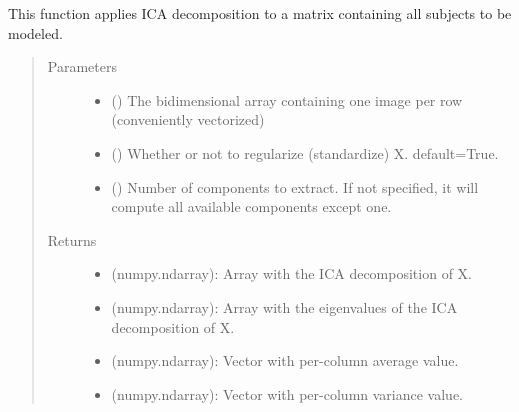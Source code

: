 \documentclass[letterpaper,10pt,english]{sphinxmanual}
\begin{document}

\begin{fulllineitems}
\label{\detokenize{api:brainSimulator.applyICA}}
This function applies ICA decomposition to a matrix containing all subjects to be modeled.
\begin{quote}\begin{description}
\item[{Parameters}] \leavevmode\begin{itemize}
\item {} 
 () \textendash{} The bidimensional array containing one image per row (conveniently vectorized)

\item {} 
 () \textendash{} Whether or not to regularize (standardize) X. default=True.

\item {} 
 () \textendash{} Number of components to extract. If not specified, it will compute all available components except one.

\end{itemize}

\item[{Returns}] \leavevmode
\begin{itemize}
\item {} 
 (numpy.ndarray): Array with the ICA decomposition of X.

\item {} 
 (numpy.ndarray): Array with the eigenvalues of the ICA         decomposition of X.

\item {} 
 (numpy.ndarray): Vector with per-column average value.

\item {} 
 (numpy.ndarray): Vector with per-column variance value.

\end{itemize}


\end{description}\end{quote}

\end{fulllineitems}
\end{document}
